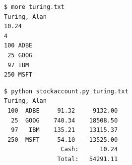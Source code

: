 \documentclass[8pt,a4paper,compress]{beamer}
\begin{document}
\begin{frame}[fragile]
\pause

\begin{lstlisting}[language={}]
$ more turing.txt 
Turing, Alan
10.24
4
100 ADBE
 25 GOOG
 97 IBM
250 MSFT
\end{lstlisting}

\pause

\begin{lstlisting}[language={}]
$ python stockaccount.py turing.txt 
Turing, Alan
 100  ADBE     91.32     9132.00
  25  GOOG    740.34    18508.50
  97   IBM    135.21    13115.37
 250  MSFT     54.10    13525.00
                Cash:      10.24
               Total:   54291.11
\end{lstlisting}
\end{frame}
\end{document}
